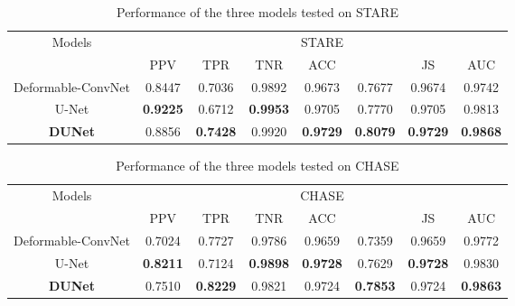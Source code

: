 \documentclass[journal]{IEEEtran}
\begin{document}
\begin{table}[]
\caption{Performance of the three models tested on STARE}
\renewcommand\arraystretch{1.3}      
\renewcommand\tabcolsep{1.5pt} 
\begin{center}
\begin{tabular}{cccccccc}
\toprule
\multirow{2}{*}{Models} & \multicolumn{7}{c}{STARE}                                                                                                  \\ \cline{2-8} 
                        & PPV             & TPR             & TNR             & ACC             &               & JS              & AUC             \\ \hline
Deformable-ConvNet      & 0.8447          & 0.7036          & 0.9892          & 0.9673          & 0.7677          & 0.9674          & 0.9742          \\ 
U-Net                   & \textbf{0.9225} & 0.6712          & \textbf{0.9953} & 0.9705          & 0.7770          & 0.9705          & 0.9813          \\
\textbf{DUNet}                   & 0.8856          & \textbf{0.7428} & 0.9920          & \textbf{0.9729} & \textbf{0.8079} & \textbf{0.9729} & \textbf{0.9868} \\
\bottomrule
\end{tabular}
\end{center}
\label{table:STARE_performance}
\end{table}

\begin{table}[]
\caption{Performance of the three models tested on CHASE}
\renewcommand\arraystretch{1.3}      
\renewcommand\tabcolsep{1.5pt} 
\begin{center}
\begin{tabular}{cccccccc}
\toprule
\multirow{2}{*}{Models} & \multicolumn{7}{c}{CHASE}                                                                                                  \\ \cline{2-8} 
                        & PPV             & TPR             & TNR             & ACC             &               & JS              & AUC             \\ \hline
Deformable-ConvNet      & 0.7024         & 0.7727          & 0.9786          & 0.9659          &  0.7359          & 0.9659         & 0.9772          \\ 
U-Net                   & \textbf{0.8211} &  0.7124         & \textbf{0.9898} &\textbf{0.9728}          &  0.7629           & \textbf{0.9728}          & 0.9830          \\
\textbf{DUNet}                   & 0.7510         & \textbf{0.8229} & 0.9821          & 0.9724 & \textbf{0.7853} & 0.9724 & \textbf{0.9863} \\
\bottomrule
\end{tabular}
\end{center}
\label{table:CHASE_performance}
\end{table}
\end{document}
